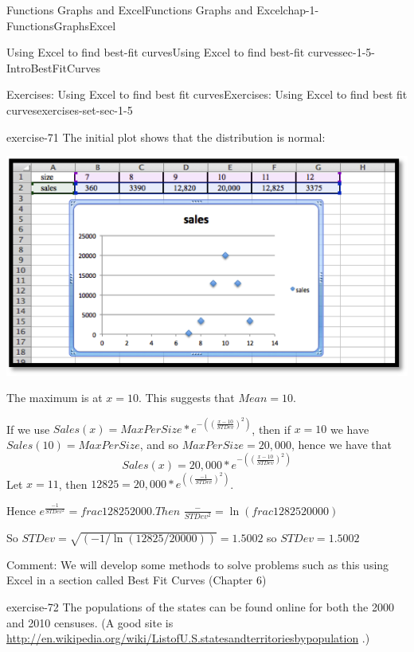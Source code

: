 \documentclass[oneside,10pt,]{book}
\numberwithin{equation}{section}
\begin{document}
\begin{chapterptx}{Functions Graphs and Excel}{}{Functions Graphs and Excel}{}{}{chap-1-FunctionsGraphsExcel}
\begin{sectionptx}{Using Excel to find best-fit curves}{}{Using Excel to find best-fit curves}{}{}{sec-1-5-IntroBestFitCurves}
\begin{exercises-subsection-numberless}{Exercises: Using Excel to find best fit curves}{}{Exercises: Using Excel to find best fit curves}{}{}{exercises-set-sec-1-5}
\begin{divisionexercise}{7}{}{}{exercise-71}
\hypertarget{p-447}{}%
The initial plot shows that the distribution is normal: \leavevmode%
\begin{sidebyside}{1}{0}{0}{0}%
\begin{sbspanel}{1}%
\includegraphics[width=1\linewidth]{images/sec1-5-sol7a.png}
\end{sbspanel}%
\end{sidebyside}%
 The maximum is at \(x = 10\). This suggests that \(Mean = 10\).%
\par
\hypertarget{p-448}{}%
If we use \(Sales (x)= MaxPerSize*e^{-\left(\left(\frac{x-10}{STDev}\right)^2 \right)}\), then if \(x = 10\) we have \(Sales (10)= MaxPerSize\), and so \(MaxPerSize = 20,000\), hence we have that%
%
\begin{equation*}
Sales (x)= 20,000*e^{-\left(\left(\frac{x-10}{STDev}\right)^2 \right)}
\end{equation*}
\hypertarget{p-449}{}%
Let \(x = 11\), then \(12825= 20,000*e^{\left(\left(\frac{-1}{STDev}\right)^2 \right)}\).%
\par
\hypertarget{p-450}{}%
Hence \(e^{\frac{-1}{STDev^2}}=frac{12825}{2000}.  Then\) \(\frac{-}{STDev^2}=\ln\left(frac{12825}{20000}\right)\)%
\par
\hypertarget{p-451}{}%
So \(STDev= \sqrt{(-1/\ln(12825/20000  ) )}=1.5002\) so \(STDev= 1.5002\)%
\par
\hypertarget{p-452}{}%
Comment: We will develop some methods to solve problems such as this using Excel in a section called Best Fit Curves (Chapter 6)%
\end{divisionexercise}%
\begin{divisionexercise}{8}{}{}{exercise-72}%
\hypertarget{p-453}{}%
The populations of the states can be found online for both the 2000 and 2010 censuses.  (A good site is \href{http://en.wikipedia.org/wiki/List_of_U.S._states_and_territories_by_population}{http:\slash{}\slash{}en.wikipedia.org\slash{}wiki\slash{}List\textunderscore{}of\textunderscore{}U.S.\textunderscore{}states\textunderscore{}and\textunderscore{}territories\textunderscore{}by\textunderscore{}population} .)%

\end{divisionexercise}
\end{exercises-subsection-numberless}
\end{sectionptx}
\end{chapterptx}
\end{document}
